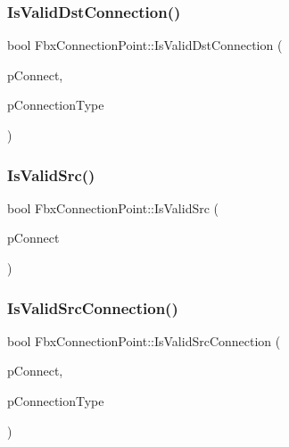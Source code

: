 \mbox{\label{class_fbx_connection_point_a29090e1e331e55a1cf68c5c742dfd771}} 
\subsubsection{\texorpdfstring{Is\+Valid\+Dst\+Connection()}{IsValidDstConnection()}}
{\footnotesize\ttfamily bool Fbx\+Connection\+Point\+::\+Is\+Valid\+Dst\+Connection (\begin{DoxyParamCaption}\item[{\hyperlink{class_fbx_connection_point}{Fbx\+Connection\+Point} $\ast$}]{p\+Connect,  }\item[{\hyperlink{class_fbx_connection_a3df448a5db356652ab99fd2be2553749}{Fbx\+Connection\+::\+E\+Type}}]{p\+Connection\+Type }\end{DoxyParamCaption})}

\mbox{\label{class_fbx_connection_point_aed1556396073c8704ea98a6012ae1207}} 
\subsubsection{\texorpdfstring{Is\+Valid\+Src()}{IsValidSrc()}}
{\footnotesize\ttfamily bool Fbx\+Connection\+Point\+::\+Is\+Valid\+Src (\begin{DoxyParamCaption}\item[{\hyperlink{class_fbx_connection_point}{Fbx\+Connection\+Point} $\ast$}]{p\+Connect }\end{DoxyParamCaption})}

\mbox{\label{class_fbx_connection_point_a8a1d3ca37e0bd5aba348746142689127}} 
\subsubsection{\texorpdfstring{Is\+Valid\+Src\+Connection()}{IsValidSrcConnection()}}
{\footnotesize\ttfamily bool Fbx\+Connection\+Point\+::\+Is\+Valid\+Src\+Connection (\begin{DoxyParamCaption}\item[{\hyperlink{class_fbx_connection_point}{Fbx\+Connection\+Point} $\ast$}]{p\+Connect,  }\item[{\hyperlink{class_fbx_connection_a3df448a5db356652ab99fd2be2553749}{Fbx\+Connection\+::\+E\+Type}}]{p\+Connection\+Type }\end{DoxyParamCaption})}

